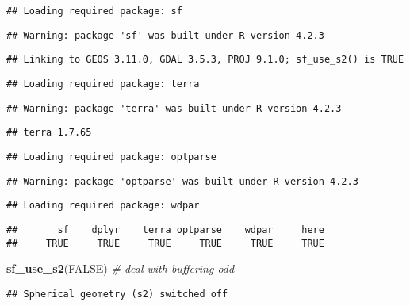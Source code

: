 \documentclass[
]{article}
\newenvironment{Shaded}{\begin{snugshade}}{\end{snugshade}}
\newcommand{\CommentTok}[1]{\textcolor[rgb]{0.56,0.35,0.01}{\textit{#1}}}
\newcommand{\ConstantTok}[1]{\textcolor[rgb]{0.56,0.35,0.01}{#1}}
\newcommand{\FunctionTok}[1]{\textcolor[rgb]{0.13,0.29,0.53}{\textbf{#1}}}
\newcommand{\NormalTok}[1]{#1}
\begin{document}
\begin{verbatim}
## Loading required package: sf
\end{verbatim}

\begin{verbatim}
## Warning: package 'sf' was built under R version 4.2.3
\end{verbatim}

\begin{verbatim}
## Linking to GEOS 3.11.0, GDAL 3.5.3, PROJ 9.1.0; sf_use_s2() is TRUE
\end{verbatim}

\begin{verbatim}
## Loading required package: terra
\end{verbatim}

\begin{verbatim}
## Warning: package 'terra' was built under R version 4.2.3
\end{verbatim}

\begin{verbatim}
## terra 1.7.65
\end{verbatim}

\begin{verbatim}
## Loading required package: optparse
\end{verbatim}

\begin{verbatim}
## Warning: package 'optparse' was built under R version 4.2.3
\end{verbatim}

\begin{verbatim}
## Loading required package: wdpar
\end{verbatim}

\begin{verbatim}
##       sf    dplyr    terra optparse    wdpar     here 
##     TRUE     TRUE     TRUE     TRUE     TRUE     TRUE
\end{verbatim}

\begin{Shaded}
\begin{Highlighting}[]
\FunctionTok{sf\_use\_s2}\NormalTok{(}\ConstantTok{FALSE}\NormalTok{) }\CommentTok{\# deal with buffering odd}
\end{Highlighting}
\end{Shaded}

\begin{verbatim}
## Spherical geometry (s2) switched off
\end{verbatim}
\end{document}
